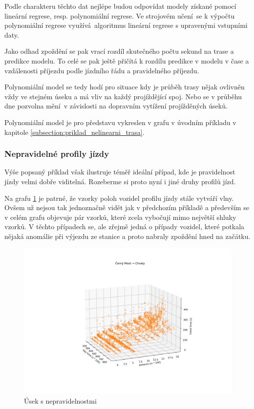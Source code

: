 Podle charakteru těchto dat nejlépe budou odpovídat modely získané pomocí lineární regrese, resp. polynomiální regrese. Ve strojovém učení se k výpočtu polynomiální regrese využívá algoritmus lineární regrese s upravenými vstupními daty.

\bigbreak

Jako odhad zpoždění se pak vrací rozdíl skutečného počtu sekund na trase a predikce modelu. To celé se pak ještě přičítá k rozdílu predikce v modelu v čase a vzdálenosti příjezdu podle jízdního řádu a pravidelného příjezdu.

\bigbreak

Polynomiální model se tedy hodí pro situace kdy je průběh trasy nějak ovlivněn vždy ve stejném úseku a má vliv na každý projíždějící spoj. Nebo se v průběhu dne pozvolna mění v závislosti na dopravním vytížení projížděných úseků.

Polynomiální model je pro představu vykreslen v grafu v úvodním příkladu v kapitole \ref{subsection:priklad_nelinearni_trasa}.

\subsubsection{Nepravidelné profily jízdy}

Výše popsaný příklad však ilustruje téměř ideální případ, kde je pravidelnost jízdy velmi dobře viditelná. Rozeberme si proto nyní i jiné druhy profilů jízd.

\bigbreak

Na grafu \ref{fig:cerny_most_chvaly} je patrné, že vzorky poloh vozidel profilu jízdy stále vytváří vlny. Ovšem už nejsou tak jednoznačně vidět jak v předchozím příkladě a především se v celém grafu objevuje pár vzorků, které zcela vybočují mimo největší shluky vzorků. V těchto případech se, ale zřejmě jedná o případy vozidel, které potkala nějaká anomálie při výjezdu ze stanice a proto nabraly zpoždění hned na začátku.

\begin{figure}
	\centering
  \includegraphics[width=\linewidth]{../img/cerny_most_chvaly.png}
  \caption{Úsek s nepravidelnostmi}
  \label{fig:cerny_most_chvaly}
\end{figure}

